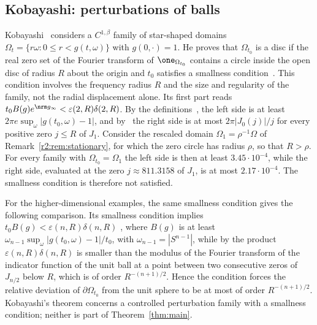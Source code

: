 \subsection{Kobayashi: perturbations of balls}
Kobayashi~\cite{Kob93} considers a $C^{1,\beta}$ family of star-shaped domains $\Omega_t=\{r\omega:0\le r<g(t,\omega)\}$ with $g(0,\cdot)=1$. He proves that $\Omega_{t_0}$ is a disc if the real zero set of the Fourier transform of $\one_{\Omega_{t_0}}$ contains a circle inside the open disc of radius $R$ about the origin and $t_0$ satisfies a smallness condition~\cite[Proposition~4.4]{Kob93}. This condition involves the frequency radius $R$ and the size and regularity of the family, not the radial displacement alone. Its first part reads $t_0B(g)e^{\nrm g_\infty}<\varepsilon(2,R)\delta(2,R)$. By the definitions~\cite[(3.3.1), (3.3.2), (4.2.1)]{Kob93}, the left side is at least $2\pi e\sup_\omega|g(t_0,\omega)-1|$, and by~\cite[(2.3.3), (2.4.1)]{Kob93} the right side is at most $2\pi|J_0(j)|/j$ for every positive zero $j\le R$ of $J_1$. Consider the rescaled domain $\Omega_1=\rho^{-1}\Omega$ of Remark~\ref{r2:rem:stationary}, for which the zero circle has radius $\rho$, so that $R>\rho$. For every family with $\Omega_{t_0}=\Omega_1$ the left side is then at least $3.45\cdot10^{-4}$, while the right side, evaluated at the zero $j\approx811.3158$ of $J_1$, is at most $2.17\cdot10^{-4}$. The smallness condition is therefore not satisfied.


For the higher-dimensional examples, the same smallness condition gives the following comparison. Its smallness condition implies $t_0B(g)<\varepsilon(n,R)\delta(n,R)$ \cite[(4.2.2b), (4.4.1b) and Lemma~4.5]{Kob93}, where $B(g)$ \cite[(4.2.1)]{Kob93} is at least $\omega_{n-1}\sup_\omega|g(t_0,\omega)-1|/t_0$, with $\omega_{n-1}=|S^{n-1}|$, while by \cite[(2.3.2), (2.3.4)]{Kob93} the product $\varepsilon(n,R)\delta(n,R)$ is smaller than the modulus of the Fourier transform of the indicator function of the unit ball at a point between two consecutive zeros of $J_{n/2}$ below $R$, which is of order $R^{-(n+1)/2}$. Hence the condition forces the relative deviation of $\partial\Omega_{t_0}$ from the unit sphere to be at most of order $R^{-(n+1)/2}$. Kobayashi's theorem concerns a controlled perturbation family with a smallness condition; neither is part of Theorem~\ref{thm:main}. 

